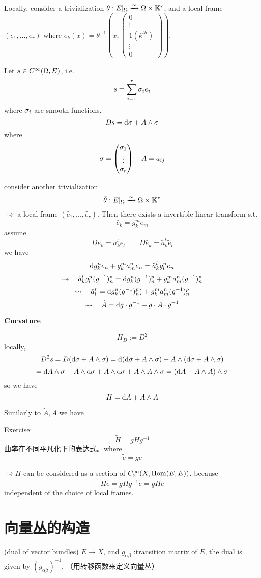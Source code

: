 Locally, consider a trivialization 
$\theta:E|_\Omega\xrightarrow{\sim}\Omega\times \mathbb{K}^r$, and a local frame 
$(e_1,...,e_r)$ where $e_k(x)=\theta^{-1}(x,\begin{pmatrix}
0\\\vdots\\1 (k^{th})\\
\vdots\\0
\end{pmatrix})$.

Let $s\in C^\infty(\Omega,E)$, i.e. 
$$s=\sum_{i=1}^r\sigma_ie_i$$
where $\sigma_i$ are smooth functions.
$$Ds=\mathrm{d}\sigma+A\wedge\sigma$$
where 
$$
  \sigma=
  \begin{pmatrix}
  \sigma_1\\\vdots\\\sigma_r
  \end{pmatrix}
  \quad
  A={a_{ij}}
$$ 

consider another trivialization 
$$\tilde\theta:E|_\Omega\xrightarrow{\sim}\Omega\times\mathbb{K}^r$$
$\rightsquigarrow$ a local frame $(\tilde{e_1},...,\tilde{e_r})$.
Then there exists a invertible linear transform s.t. 
$$\tilde{e_k}=g_k^me_m$$
assume 
$$De_k=a_k^le_l\qquad
D\tilde{e_k}=\tilde{a}_k^l\tilde{e}_l$$
we have 
$$\mathrm{d} g_k^ne_n+g_k^ma_m^ne_n=\tilde{a}_k^lg_l^ne_n$$
$$\rightsquigarrow\quad
\tilde{a}_k^lg_l^n(g^{-1})^p_n=\mathrm{d} g_k^n(g^{-1})^p_n+g_k^ma_m^n(g^{-1})^p_n$$
$$\rightsquigarrow\quad
\tilde{a}_l^p=\mathrm{d} g_k^n(g^{-1})^p_n)+g_k^ma^n_m(g^{-1})^p_n
$$
$$\rightsquigarrow\quad
\tilde{A}=\mathrm{d} g\cdot g^{-1}+g\cdot A\cdot g^{-1}$$

\textbf{Curvature}

$$H_D:=D^2$$%
locally, 
$$D^2s=D(\mathrm{d}\sigma+A\wedge\sigma)=
\mathrm{d}(\mathrm{d}\sigma+A\wedge\sigma)+A\wedge(\mathrm{d}\sigma+A\wedge\sigma)$$
$$
  =\mathrm{d} A\wedge\sigma-A\wedge\mathrm{d}\sigma+A\wedge\mathrm{d}\sigma+A\wedge A\wedge\sigma
  =(\mathrm{d} A+A\wedge A)\wedge\sigma 
$$
so we have 
$$H=\mathrm{d} A+A\wedge A$$

Similarly to $\tilde{A},A$ we have 

Exercise:
$$\tilde{H}=gHg^{-1}$$
曲率在不同平凡化下的表达式。where 
$$\tilde{e}=ge$$

$\rightsquigarrow H$ can be considered as a section of $C^\infty_2(X,\operatorname{Hom}(E,E))$.
because
$$\tilde{H}\tilde{e}=gHg^{-1}\tilde{e}=gHe$$
independent of the choice of local frames.

\section{向量丛的构造}
\begin{definition}(dual of vector bundles)
$E\to X$, and $g_{\alpha\beta}$ :transition matrix of $E$, 
the dual is given by 
$(g_{\alpha\beta})^{-1}$.
（用转移函数来定义向量丛）
\end{definition}

